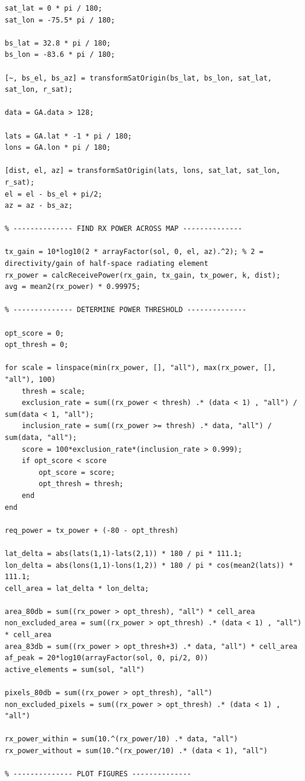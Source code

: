 \documentclass[12pt]{article}
\begin{document}
\begin{enumerate}
\begin{lstlisting}
sat_lat = 0 * pi / 180;
sat_lon = -75.5* pi / 180;

bs_lat = 32.8 * pi / 180;
bs_lon = -83.6 * pi / 180;

[~, bs_el, bs_az] = transformSatOrigin(bs_lat, bs_lon, sat_lat, sat_lon, r_sat);

data = GA.data > 128;

lats = GA.lat * -1 * pi / 180;
lons = GA.lon * pi / 180; 

[dist, el, az] = transformSatOrigin(lats, lons, sat_lat, sat_lon, r_sat);
el = el - bs_el + pi/2;
az = az - bs_az;

% -------------- FIND RX POWER ACROSS MAP --------------

tx_gain = 10*log10(2 * arrayFactor(sol, 0, el, az).^2); % 2 = directivity/gain of half-space radiating element
rx_power = calcReceivePower(rx_gain, tx_gain, tx_power, k, dist);
avg = mean2(rx_power) * 0.99975;

% -------------- DETERMINE POWER THRESHOLD --------------

opt_score = 0;
opt_thresh = 0;

for scale = linspace(min(rx_power, [], "all"), max(rx_power, [], "all"), 100)
    thresh = scale;
    exclusion_rate = sum((rx_power < thresh) .* (data < 1) , "all") / sum(data < 1, "all");
    inclusion_rate = sum((rx_power >= thresh) .* data, "all") / sum(data, "all");
    score = 100*exclusion_rate*(inclusion_rate > 0.999);
    if opt_score < score
        opt_score = score;
        opt_thresh = thresh;
    end
end

req_power = tx_power + (-80 - opt_thresh)

lat_delta = abs(lats(1,1)-lats(2,1)) * 180 / pi * 111.1;
lon_delta = abs(lons(1,1)-lons(1,2)) * 180 / pi * cos(mean2(lats)) * 111.1;
cell_area = lat_delta * lon_delta;

area_80db = sum((rx_power > opt_thresh), "all") * cell_area
non_excluded_area = sum((rx_power > opt_thresh) .* (data < 1) , "all") * cell_area
area_83db = sum((rx_power > opt_thresh+3) .* data, "all") * cell_area
af_peak = 20*log10(arrayFactor(sol, 0, pi/2, 0))
active_elements = sum(sol, "all")

pixels_80db = sum((rx_power > opt_thresh), "all")
non_excluded_pixels = sum((rx_power > opt_thresh) .* (data < 1) , "all")

rx_power_within = sum(10.^(rx_power/10) .* data, "all")
rx_power_without = sum(10.^(rx_power/10) .* (data < 1), "all")

% -------------- PLOT FIGURES --------------


\end{lstlisting}
\end{enumerate}
\end{document}
